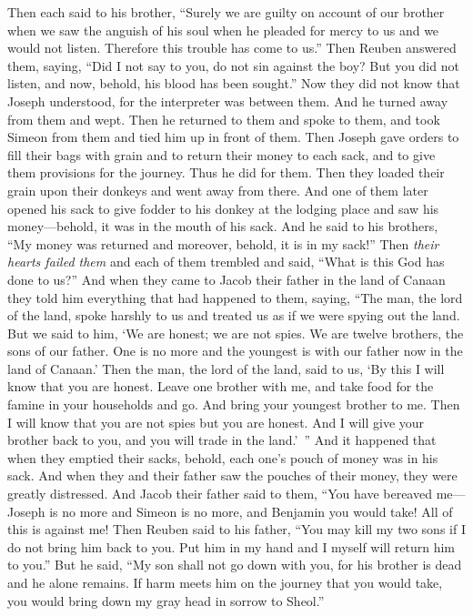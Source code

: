 \begin{biblechapter}
\verse Then each said to his brother, “Surely we are guilty on account of our brother when we saw the anguish of his soul when he pleaded for mercy to us and we would not listen. Therefore this trouble has come to us.”
\verse Then Reuben answered them, saying, “Did I not say to you, do not sin against the boy? But you did not listen, and now, behold, his blood has been sought.”
\verse Now they did not know that Joseph understood, for the interpreter was between them.
\verse And he turned away from them and wept. Then he returned to them and spoke to them, and took Simeon from them and tied him up in front of them.
\verse Then Joseph gave orders to fill their bags with grain and to return their money to each sack, and to give them provisions for the journey. Thus he did for them.
\verse Then they loaded their grain upon their donkeys and went away from there.
\verse And one of them later opened his sack to give fodder to his donkey at the lodging place and saw his money—behold, it was in the mouth of his sack.
\verse And he said to his brothers, “My money was returned and moreover, behold, it is in my sack!” Then \textit{their hearts failed them} and each of them trembled and said, “What is this God has done to us?”
\verse And when they came to Jacob their father in the land of Canaan they told him everything that had happened to them, saying,
\verse “The man, the lord of the land, spoke harshly to us and treated us as if we were spying out the land.
\verse But we said to him, ‘We are honest; we are not spies.
\verse We are twelve brothers, the sons of our father. One is no more and the youngest is with our father now in the land of Canaan.’
\verse Then the man, the lord of the land, said to us, ‘By this I will know that you are honest. Leave one brother with me, and take food for the famine in your households and go.
\verse And bring your youngest brother to me. Then I will know that you are not spies but you are honest. And I will give your brother back to you, and you will trade in the land.’ ”
\verse And it happened that when they emptied their sacks, behold, each one’s pouch of money was in his sack. And when they and their father saw the pouches of their money, they were greatly distressed.
\verse And Jacob their father said to them, “You have bereaved me—Joseph is no more and Simeon is no more, and Benjamin you would take! All of this is against me!
\verse Then Reuben said to his father, “You may kill my two sons if I do not bring him back to you. Put him in my hand and I myself will return him to you.”
\verse But he said, “My son shall not go down with you, for his brother is dead and he alone remains. If harm meets him on the journey that you would take, you would bring down my gray head in sorrow to Sheol.”
\end{biblechapter}

